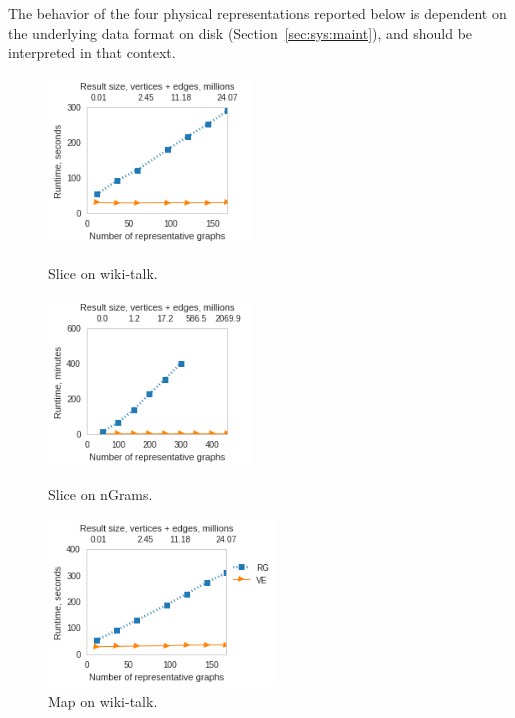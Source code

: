 The behavior of the four physical representations reported below is
dependent on the underlying data format on disk
(Section~\ref{sec:sys:maint}), and should be interpreted in that
context.

\begin{figure}[!ht]
\centering
\begin{minipage}{2.1in}
\centering
\includegraphics[width=2.1in]{figs/slice_wikitalk_build13.png}
\vspace{-0.2in}
\caption{Slice on wiki-talk.}
\label{fig:slicewiki}
\vspace{-0.1in}
\end{minipage}
\begin{minipage}{2.1in}
\centering
\includegraphics[width=2.1in]{figs/slice_ngrams_build13.png}
\vspace{-0.2in}
\caption{Slice on nGrams.}
\label{fig:slicengrams}
\vspace{-0.1in}
\end{minipage}
\begin{minipage}{2.1in}
\centering
\includegraphics[width=2.4in]{figs/project_wikitalk_build13.png}
\vspace{-0.2in}
\caption{Map on wiki-talk.}
\label{fig:project}
\vspace{-0.1in}
\end{minipage}
\end{figure}

